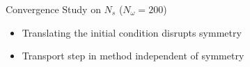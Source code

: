 \documentclass{beamer}
\begin{document}
\begin{frame}{Convergence Study on $N_s$ \quad ($N_\omega = 200$)}
	\centering
	\begin{itemize}
		\item Translating the initial condition disrupts symmetry
		\item Transport step in method independent of symmetry
	\end{itemize}  
	\centering
\end{frame}
\end{document}
